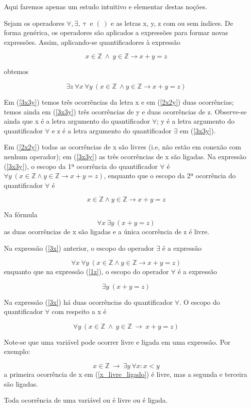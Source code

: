 Aqui faremos apenas um estudo intuitivo e elementar destas noções.

Sejam os operadores $\forall, \exists, \uptau\ \text{e } (\ )$ e as letras x, y, z com ou sem índices.
De forma genérica, os operadores são aplicados a expressões para formar novas expressões.
Assim, aplicando-se quantificadores à expressão

\begin{equation}\label{2x2y}
    x \in \mathbb{Z}\ \land\ y \in \mathbb{Z} \to x + y = z \tag{1}
\end{equation}

obtemos

\begin{equation}\label{3x3y}
    \exists z\ \forall x\ \forall y\ (x \in \mathbb{Z}\ \land y \in \mathbb{Z} \to x + y = z) \tag{2}
\end{equation}

Em (\ref{3x3y}) temos três ocorrências da letra x e em (\ref{2x2y}) duas ocorrências; temos ainda em (\ref{3x3y}) três ocorrências de y e duas ocorrências de z.
Observe-se ainda que x é a letra argumento do quantificador $\forall$; y é a letra argumento do quantificador $\forall$ e z é a letra argumento do quantificador $\exists$ em (\ref{3x3y}).

Em (\ref{2x2y}) todas as ocorrências de x são livres (i.e, não estão em conexão com nenhum operador); em (\ref{3x3y}) as três ocorrências de x são ligadas.
Na expressão (\ref{3x3y}), o escopo da 1ª ocorrência do quantificador $\forall$ é $\forall y\ (x \in \mathbb{Z} \land y \in \mathbb{Z} \to x + y = z)$, enquanto que o escopo da 2ª ocorrência do quantificador $\forall$ é

$$x \in \mathbb{Z} \land y \in \mathbb{Z} \to x + y = z$$

Na fórmula
\begin{equation}\label{1z}
    \forall x\ \exists y\ (x + y = z) \tag{3}
\end{equation}
as duas ocorrências de x são ligadas e a única ocorrência de z é livre.

Na expressão (\ref{3x}) anterior, o escopo do operador $\exists$ é a expressão

$$\forall x\ \forall y\ (x \in \mathbb{Z} \land y \in \mathbb{Z} \to x + y = z)$$
enquanto que na expressão (\ref{1z}), o escopo do operador $\forall$ é a expressão

$$\exists y\ (x + y = z)$$

Na expressão (\ref{3x}) há duas ocorrências do quantificador $\forall$.
O escopo do quantificador $\forall$ com respeito a x é

$$\forall y\ (x \in \mathbb{Z}\ \land\ y \in \mathbb{Z}\ \to\ x + y = z)$$

Note-se que uma variável pode ocorrer livre e ligada em uma expressão.
Por exemplo:

\begin{equation}\label{x_livre_ligado}
    x \in \mathbb{Z}\ \to\ \exists y\ \forall x \colon x < y \tag{4}
\end{equation}
a primeira ocorrência de x em (\ref{x_livre_ligado}) é livre, mas a segunda e terceira são ligadas.

Toda ocorrência de uma variável ou é livre ou é ligada.
